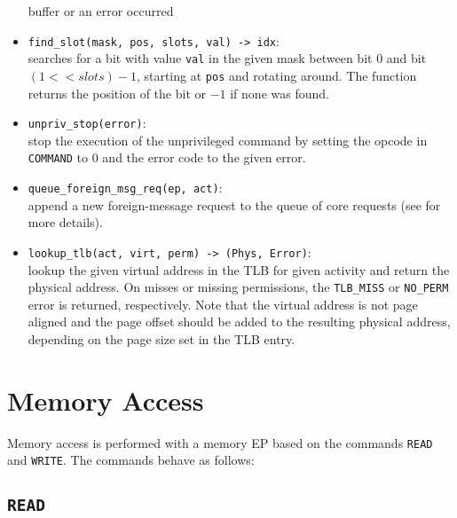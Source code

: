 \begin{itemize}
  buffer or an error occurred
  \item \texttt{find\_slot(mask, pos, slots, val) -> idx}:\\
  searches for a bit with value \texttt{val} in the given mask between bit 0 and bit $(1 << slots) -
  1$, starting at \texttt{pos} and rotating around. The function returns the position of the bit or
  $-1$ if none was found.
  \item \texttt{unpriv\_stop(error)}:\\
  stop the execution of the unprivileged command by setting the opcode in \texttt{COMMAND} to 0 and
  the error code to the given error.
  \item \texttt{queue\_foreign\_msg\_req(ep, act)}:\\
  append a new foreign-message request to the queue of core requests (see
   for more details).\extend{}
  \item \texttt{lookup\_tlb(\colorbox{tilemux}{act, }virt, perm) -> (Phys, Error)}:\\
  lookup the given virtual address in the TLB \colorbox{tilemux}{for given activity} and return the
  physical address. On misses or missing permissions, the \texttt{TLB\_MISS} or \texttt{NO\_PERM}
  error is returned, respectively. Note that the virtual address is not page aligned and the page
  offset should be added to the resulting physical address, depending on the page size set in the
  TLB entry.\extend{}
\end{itemize}

\section{Memory Access}

Memory access is performed with a memory EP based on the commands \texttt{READ} and \texttt{WRITE}.
The commands behave as follows:

\subsection{\texttt{READ}}

